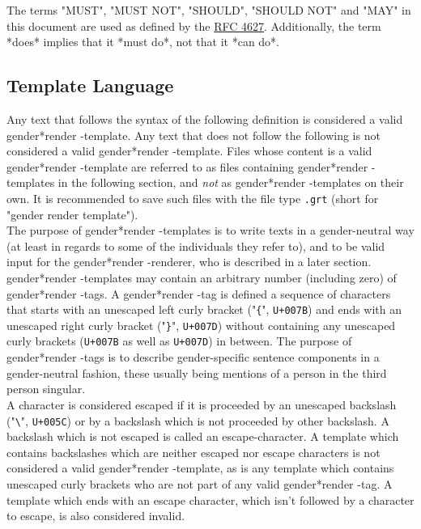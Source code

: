 \documentclass{article}
\newcommand{\GenderRender}{
    gender*render
}
\begin{document}
    The terms "MUST", "MUST NOT", "SHOULD", "SHOULD NOT" and "MAY" in this document are used as defined by the \href{https://tools.ietf.org/html/rfc2119}{RFC 4627}.
    Additionally, the term *does* implies that it *must do*, not that it *can do*.

    \subsection{Template Language}

    Any text that follows the syntax of the following definition is considered a valid \GenderRender-template.
    Any text that does not follow the following is not considered a valid \GenderRender-template.
    Files whose content is a valid \GenderRender-template are referred to as files containing \GenderRender-templates in the following section, and \emph{not} as \GenderRender-templates on their own.
    It is recommended to save such files with the file type \texttt{.grt} (short for "gender render template").\\

    The purpose of \GenderRender-templates is to write texts in a gender-neutral way (at least in regards to some of the individuals they refer to), and to be valid input for the \GenderRender-renderer, who is described in a later section.\\

    \GenderRender-templates may contain an arbitrary number (including zero) of \GenderRender-tags.
    A \GenderRender-tag is defined a sequence of characters that starts with an unescaped left curly bracket ("\texttt{\{}", \texttt{U+007B}) and ends with an unescaped right curly bracket ("\texttt{\}}", \texttt{U+007D}) without containing any unescaped curly brackets (\texttt{U+007B} as well as \texttt{U+007D}) in between.
    The purpose of \GenderRender-tags is to describe gender-specific sentence components in a gender-neutral fashion, these usually being mentions of a person in the third person singular.\\

    A character is considered escaped if it is proceeded by an unescaped backslash ("\texttt{\textbackslash}", \texttt{U+005C}) or by a backslash which is not proceeded by other backslash.
    A backslash which is not escaped is called an escape-character.
    A template which contains backslashes which are neither escaped nor escape characters is not considered a valid \GenderRender-template, as is any template which contains unescaped curly brackets who are not part of any valid \GenderRender-tag.
    A template which ends with an escape character, which isn't followed by a character to escape, is also considered invalid.\\
\end{document}
